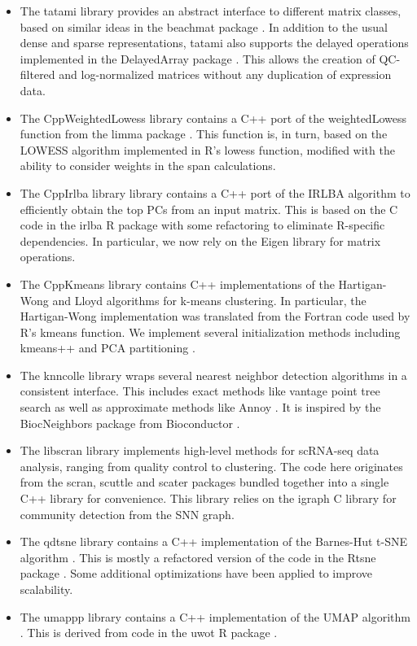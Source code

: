 \documentclass{article}
\begin{document}
\begin{itemize}
\item The tatami library \cite{tatami} provides an abstract interface to different matrix classes, 
based on similar ideas in the beachmat package \cite{lun2018beachmat}. 
In addition to the usual dense and sparse representations, tatami also supports the delayed operations implemented in the DelayedArray package \cite{delayedarray}.
This allows the creation of QC-filtered and log-normalized matrices without any duplication of expression data.
\item The CppWeightedLowess library \cite{cppweightedlowess} contains a C++ port of the weightedLowess function from the limma package \cite{ritchie2015limma}.
This function is, in turn, based on the LOWESS algorithm \cite{cleveland1979robust} implemented in R's lowess function, 
modified with the ability to consider weights in the span calculations.
\item The CppIrlba library \cite{cppirlba} library contains a C++ port of the IRLBA algorithm \cite{baglama2005augmented} to efficiently obtain the top PCs from an input matrix.
This is based on the C code in the irlba R package \cite{irlba} with some refactoring to eliminate R-specific dependencies.
In particular, we now rely on the Eigen library \cite{eigenweb} for matrix operations.
\item The CppKmeans library \cite{cppkmeans} contains C++ implementations of the Hartigan-Wong \cite{hartiganwong} and Lloyd algorithms \cite{lloyd} for k-means clustering.
In particular, the Hartigan-Wong implementation was translated from the Fortran code used by R's kmeans function.
We implement several initialization methods including kmeans++ \cite{vassilvitskii2006kmeanspp} and PCA partitioning \cite{su2007search}.
\item The knncolle library \cite{knncolle} wraps several nearest neighbor detection algorithms in a consistent interface. 
This includes exact methods like vantage point tree search \cite{yianilos1993data} as well as approximate methods like Annoy \cite{annoy}.
It is inspired by the BiocNeighbors package from Bioconductor \cite{biocneighbors}.
\item The libscran library \cite{libscran} implements high-level methods for scRNA-seq data analysis, ranging from quality control to clustering.
The code here originates from the scran, scuttle and scater packages \cite{lun2016step,lun2017scater} bundled together into a single C++ library for convenience. 
This library relies on the igraph C library \cite{csardi2006igraph} for community detection from the SNN graph.
\item The qdtsne library \cite{qdtsne} contains a C++ implementation of the Barnes-Hut t-SNE algorithm \cite{maaten2014accelerating}.
This is mostly a refactored version of the code in the Rtsne package \cite{rtsne}.
Some additional optimizations have been applied to improve scalability.
\item The umappp library \cite{umappp} contains a C++ implementation of the UMAP algorithm \cite{mcinnes2018umap}.
This is derived from code in the uwot R package \cite{uwot}.
\end{itemize}
\end{document}
